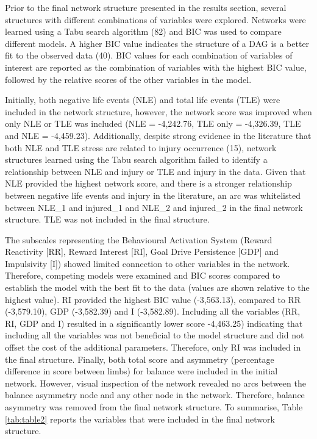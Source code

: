 \documentclass[
  english,
  man]{apa6}
\begin{document}
Prior to the final network structure presented in the results section, several structures with different combinations of variables were explored.
Networks were learned using a Tabu search algorithm (82) and BIC was used to compare different models.
A higher BIC value indicates the structure of a DAG is a better fit to the observed data (40).
BIC values for each combination of variables of interest are reported as the combination of variables with the highest BIC value, followed by the relative scores of the other variables in the model.

Initially, both negative life events (NLE) and total life events (TLE) were included in the network structure, however, the network score was improved when only NLE or TLE was included (NLE = -4,242.76, TLE only = -4,326.39, TLE and NLE = -4,459.23).
Additionally, despite strong evidence in the literature that both NLE and TLE stress are related to injury occurrence (15), network structures learned using the Tabu search algorithm failed to identify a relationship between NLE and injury or TLE and injury in the data.
Given that NLE provided the highest network score, and there is a stronger relationship between negative life events and injury in the literature, an arc was whitelisted between NLE\_1 and injured\_1 and NLE\_2 and injured\_2 in the final network structure.
TLE was not included in the final structure.

The subscales representing the Behavioural Activation System (Reward Reactivity {[}RR{]}, Reward Interest {[}RI{]}, Goal Drive Persistence {[}GDP{]} and Impulsivity {[}I{]}) showed limited connection to other variables in the network.
Therefore, competing models were examined and BIC scores compared to establish the model with the best fit to the data (values are shown relative to the highest value).
RI provided the highest BIC value (-3,563.13), compared to RR (-3,579.10), GDP (-3,582.39) and I (-3,582.89).
Including all the variables (RR, RI, GDP and I) resulted in a significantly lower score -4,463.25) indicating that including all the variables was not beneficial to the model structure and did not offset the cost of the additional parameters.
Therefore, only RI was included in the final structure.
Finally, both total score and asymmetry (percentage difference in score between limbs) for balance were included in the initial network.
However, visual inspection of the network revealed no arcs between the balance asymmetry node and any other node in the network.
Therefore, balance asymmetry was removed from the final network structure.
To summarise, Table \ref{tab:table2} reports the variables that were included in the final network structure.
\end{document}
